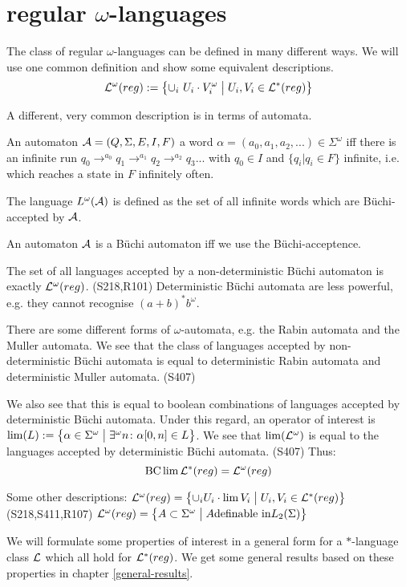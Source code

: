 \section{regular $\omega$-languages}
\label{reg-omega-lang}

The class of regular $\omega$-languages can be defined in many different ways. We will use one common definition and show some equivalent descriptions.
\[ \Lang^\omega(reg) := \Set{ \cup_i\ U_i \cdot V_i^\omega }{ U_i, V_i \in \Lang^*(reg) } \]

A different, very common description is in terms of automata.

An automaton $\mathcal{A} = (Q, \Sigma, E, I, F)$  a word $\alpha = (a_0,a_1,a_2,...) \in \Sigma^\omega$ iff there is an infinite run $q_0 \rightarrow^{a_0} q_1 \rightarrow^{a_1} q_2 \rightarrow^{a_2} q_3 ...$ with $q_0 \in I$ and $\{ q_i | q_i \in F \}$ infinite, i.e. which reaches a state in $F$ infinitely often.

The language $L^\omega(\mathcal{A})$ is defined as the set of all infinite words which are Büchi-accepted by  $\mathcal{A}$.

An automaton $\mathcal{A}$ is a Büchi automaton iff we use the Büchi-acceptence.

The set of all languages accepted by a non-deterministic Büchi automaton is exactly $\mathcal{L}^\omega(reg)$. (S218,R101) Deterministic Büchi automata are less powerful, e.g. they cannot recognise $(a+b)^* b^\omega$.

There are some different forms of $\omega$-automata, e.g. the Rabin automata and the Muller automata. We see that the class of languages accepted by non-deterministic Büchi automata is equal to deterministic Rabin automata and deterministic Muller automata. (S407)

We also see that this is equal to boolean combinations of languages accepted by deterministic Büchi automata. Under this regard, an operator of interest is $\lim(L) := \Set{ \alpha \in \Sigma^\omega }{ \existsinf n \colon \alpha[0,n] \in L }$. We see that $\lim(\mathcal{L}^\omega)$ is equal to the languages accepted by deterministic Büchi automata. (S407) Thus:
\[  \operatorname{BC} \lim \mathcal{L}^*(reg) = \mathcal{L}^\omega(reg) \]

Some other descriptions:
$\Lang^\omega(reg) = \Set{ \cup_i U_i \cdot \lim V_i }{ U_i, V_i \in \Lang^*(reg) }$ (S218,S411,R107)
$\Lang^\omega(reg) = \Set{A \subset \Sigma^\omega}{A \text{definable in} L_2(\Sigma)}$

We will formulate some properties of interest in a general form for a $*$-language class $\mathcal{L}$ which all hold for $\mathcal{L}^*(reg)$. We get some general results based on these properties in chapter \ref{general-results}.

